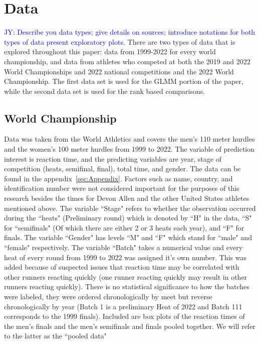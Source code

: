 \documentclass[12pt, letterpaper, titlepage]{article}
\newcommand{\jy}[1]{\textcolor{blue}{JY: #1}}
\begin{document}
\section{Data} \label{sec:Data}

\jy{Describe you data types; give details on sources; introduce notations for
  both types of data
  present exploratory plots.}
There are two types of data that is explored throughout this paper: data from
1999-2022 for every world championship, and data from athletes who competed
at both the 2019 and 2022 World Championships and 2022 national competitions
and the 2022 World Championship.  The first data set is used for the GLMM portion
of the paper, while the second data set is used for the rank based comparisons.

\subsection{World Championship}
Data was taken from the World Athletics and covers the men's 110 meter hurdles 
and the women's 100 meter hurdles from 1999 to 2022.  The variable of prediction 
interest is reaction time, and the predicting variables are year, stage of 
competition (heats, semifinal, final), total time, and gender.  
The data can be found in the appendix~\ref{sec:Appendix}. Factors such as name, 
country, and identification number were not considered important for the 
purposes of this research besides the times for Devon Allen and the other 
United States athletes mentioned above.  The variable ``Stage"
refers to whether the observation occurred during the ``heats" (Preliminary round) which
is denoted by ``H" in the data, ``S" for ``semifinals" (Of which there are either 2 or 3 
heats each year), and ``F" for finals. The variable ``Gender" has levels ``M" and ``F" 
which stand for ``male" and ``female" respectively.  The variable ``Batch" takes a 
numerical value and every heat of every round from 1999 to 2022 was assigned it's
own number.  This was added because of suspected issues that reaction time may be
correlated with other runners reacting quickly (one runner reacting quickly may
result in other runners reacting quickly).  There is no statistical significance to
how the batches were labeled, they were ordered chronologically by meet but
reverse chronologically by year (Batch 1 is a preliminary Heat of 2022 and Batch
111 corresponds to the 1999 finals). Included are
box plots of the reaction times of the men's finals and the men's semifinals and
finals pooled together.  We will refer to the latter as the ``pooled data"
\end{document}

